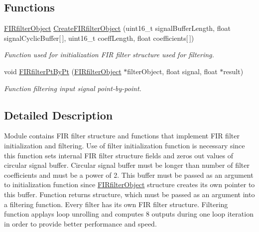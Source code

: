 \subsection*{Functions}
\begin{DoxyCompactItemize}
\item 
\mbox{\hyperlink{struct_f_i_rfilter_object}{F\+I\+Rfilter\+Object}} \mbox{\hyperlink{group___f_i_rfilter_pt_by_pt_gae24f77edcdeca201e05d8c2e00e9e6d8_gae24f77edcdeca201e05d8c2e00e9e6d8}{Create\+F\+I\+Rfilter\+Object}} (uint16\+\_\+t signal\+Buffer\+Length, float signal\+Cyclic\+Buffer\mbox{[}$\,$\mbox{]}, uint16\+\_\+t coeff\+Length, float coefficients\mbox{[}$\,$\mbox{]})
\begin{DoxyCompactList}\small\item\em Function used for initialization F\+IR filter structure used for filtering. \end{DoxyCompactList}\item 
void \mbox{\hyperlink{group___f_i_rfilter_pt_by_pt_ga6e77d8e56981d788538c72945b28f84b_ga6e77d8e56981d788538c72945b28f84b}{F\+I\+Rfilter\+Pt\+By\+Pt}} (\mbox{\hyperlink{struct_f_i_rfilter_object}{F\+I\+Rfilter\+Object}} $\ast$filter\+Object, float signal, float $\ast$result)
\begin{DoxyCompactList}\small\item\em Function filtering input signal point-\/by-\/point. \end{DoxyCompactList}\end{DoxyCompactItemize}


\subsection{Detailed Description}
Module contains F\+IR filter structure and functions that implement F\+IR filter initialization and filtering. Use of filter initialization function is necessary since this function sets internal F\+IR filter structure fields and zeros out values of circular signal buffer. Circular signal buffer must be longer than number of filter coefficients and must be a power of 2. This buffer must be passed as an argument to initialization function since \mbox{\hyperlink{struct_f_i_rfilter_object}{F\+I\+Rfilter\+Object}} structure creates it\textquotesingle{}s own pointer to this buffer. Function returns structure, which must be passed as an argument into a filtering function. Every filter has it\textquotesingle{}s own F\+IR filter structure. Filtering function applays loop unrolling and computes 8 outputs during one loop iteration in order to provide better performance and speed. 



